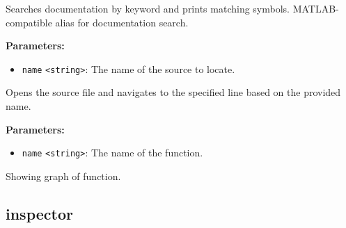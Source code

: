 \documentclass[12pt,a4paper]{article}
\begin{document}
\noindent Searches documentation by keyword and prints matching symbols.
MATLAB-compatible alias for documentation search.

\vspace{5mm}
\noindent {}


\noindent \textbf{Parameters:}
\begin{itemize}
  \item \texttt{name} \texttt{<string>}: The name of the source to locate.
\end{itemize}

\noindent Opens the source file and navigates to the specified line based on the provided name.

\vspace{5mm}
\noindent {}


\noindent \textbf{Parameters:}
\begin{itemize}
  \item \texttt{name} \texttt{<string>}: The name of the function.
\end{itemize}

\noindent Showing graph of function.


\subsection{inspector}
\vspace{5mm}
\noindent {}
\end{document}
